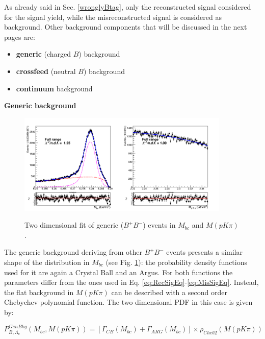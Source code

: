 As already said in Sec. \ref{wronglyBtag}, only the reconstructed signal considered for the signal yield, while the misreconstructed signal is considered as background.
Other background components that will be discussed in the next pages are:

\begin{itemize}
    \item \textbf{generic} (charged $B$) background
    \item \textbf{crossfeed} (neutral $B$) background 
    \item \textbf{continuum} background 
\end{itemize}
\vspace{0.2 cm}

\newpage
\noindent \textbf{Generic background}
\begin{figure}[H]
{\includegraphics[width=0.9\textwidth]{04-chargedCorrBtoLambda/figs/streams12345_charged_corrLambdaC_Generic_2DFit.png}}
\caption{Two dimensional fit of generic ($B^+B^-$) events in $M_{bc}$  and $M(p K \pi)$. }
\label{fig:5streams_Generic_charged_corrLambdaC_2Dfit}
\end{figure}
\noindent The generic background deriving from other $B^{+}B^-$ events presents a 
similar shape of the distribution in $M_{bc}$ (see Fig. \ref{fig:5streams_Generic_charged_corrLambdaC_2Dfit}): the probability
density functions used for it are again a  Crystal Ball and an Argus. For both functions the parameters differ from the ones used in Eq. \ref{eq:RecSigEq}-\ref{eq:MisSigEq}.
Instead, the flat background in $M(p K \pi)$ can be described with a second order Chebychev polynomial function. The two dimensional PDF in this case is given by:

\begin{equation}
P^{GenBkg}_{B,\Lambda_c}(M_{bc}, M(p K \pi)) = [\Gamma_{CB}(M_{bc}) + \Gamma_{ARG}(M_{bc})] \times \rho_{Cheb2}(M(p K \pi))
 \end{equation}


